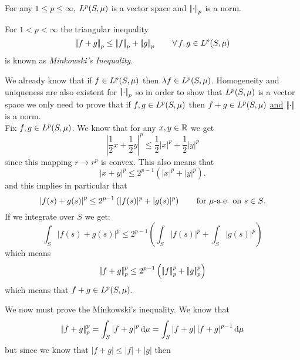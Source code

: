 \documentclass{article}
\begin{document}
\begin{theorem}
	For any $1\leq p\leq\infty$, $L^{p}(S,\mu)$ is a vector space and $\left|\negthinspace\left|\cdot\right|\negthinspace\right|_{p}$ is a norm.
\end{theorem}
\begin{remark}
	For $1<p<\infty$ the triangular inequality
	\begin{equation*}
		\left|\negthinspace\left|f+g\right|\negthinspace\right|_p\leq\left|\negthinspace\left|f\right|\negthinspace\right|_p+\left|\negthinspace\left|g\right|\negthinspace\right|_p\qquad\forall\, f,g\in L^{p}(S,\mu)
	\end{equation*}
	is known as \emph{Minkowski's Inequality}.
\end{remark}
\begin{fancyproof}
	We already know that if $f\in L^{p}(S,\mu)$ then $\lambda f\in L^{p}(S,\mu)$. Homogeneity and uniqueness are also existent for $\left|\negthinspace\left|\cdot\right|\negthinspace\right|_p$ so in order to show that $L^{p}(S,\mu)$ is a vector space we only need to prove that if $f,g\in L^{p}(S,\mu)$ then $f+g\in L^{p}(S,\mu)$ \underline{and} $\left|\negthinspace\left|\cdot\right|\negthinspace\right|$ is a norm. \\
	Fix $f,g\in L^{p}(S,\mu)$. We know that for any $x,y\in\mathbb{R}$ we get
	\begin{equation*}
		\left|\frac{1}{2}x+\frac{1}{2}y\right|^{p}\leq\frac{1}{2}|x|^p+\frac{1}{2}|y|^{p}
	\end{equation*}
	since this mapping $r\to r^p$ is convex. This also means that
	\begin{equation*}
		\left|x+y\right|^p\leq2^{p-1}\left(|x|^{p}+|y|^{p}\right).
	\end{equation*}
	and this implies in particular that
	\begin{equation*}
		\left|f(s)+g(s)\right|^{p}\leq2^{p-1}\left(|f(s)|^{p}+|g(s)|^{p}\right)\qquad\text{for $\mu$-a.e. on $s\in S$}.
	\end{equation*}
	If we integrate over $S$ we get:
	\begin{equation*}
		\int_S\left|f(s)+g(s)\right|^{p}\leq2^{p-1}\left(\int_S|f(s)|^{p}+\int_S|g(s)|^{p}\right)
	\end{equation*}
	which means 
	\begin{equation*}
		\left|\negthinspace\left|f+g\right|\negthinspace\right|_{p}^{p}\leq2^{p-1}\left(\left|\negthinspace\left|f\right|\negthinspace\right|^p_p+\left|\negthinspace\left|g\right|\negthinspace\right|^p_p\right)
	\end{equation*}
	which means that $f+g\in L^{p}(S,\mu)$. \par
	We now must prove the Minkowski's inequality. We know that
	\begin{equation*}
			\left|\negthinspace\left|f+g\right|\negthinspace\right|_{p}^{p}=\int_S\left|f+g\right|^{p}\mathop{}\!\mathrm{d}\mu=\int_S\left|f+g\right|\left|f+g\right|^{p-1}\mathop{}\!\mathrm{d}\mu
	\end{equation*}
	but since we know that $\left|f+g\right|\leq|f|+|g|$ then

\end{fancyproof}
\end{document}
